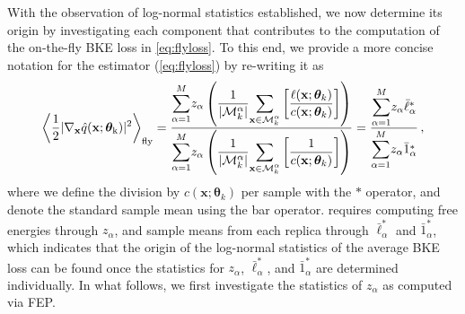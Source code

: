 \documentclass{article}
\numberwithin{equation}{section}
\def\*#1{\mathbf{#1}}
\theoremstyle{definition}
\theoremstyle{remark}
\def\thetab{\boldsymbol{\theta}}
\begin{document}
With the observation of log-normal statistics established, we now determine its origin by investigating each component that contributes to the computation of the on-the-fly BKE loss in \cref{eq:flyloss}. To this end, we provide a more concise notation for the estimator (\cref{eq:flyloss}) by re-writing it as
\begin{align}
    \left\langle \frac{1}{2} |\nabla_{\* x} \hat{q}(\* x; \thetab_{\mathrm{k}}) |^2 \right\rangle_{\mathrm{fly}} = \frac{\mathlarger{\sum}\limits_{\alpha=1}^M  z_{\alpha} \left(\dfrac{1}{|\mathcal{M}^\alpha_k|}\mathlarger{\sum}\limits_{\* x \in \mathcal{M}^\alpha_k}  \left[\dfrac{\ell(\* x; \thetab_{k})}{c(\* x; \thetab_k)} \right] \right) }{ \mathlarger{\sum}\limits_{\alpha=1}^M z_{\alpha}\left(\dfrac{1}{|\mathcal{M}^\alpha_k|}\mathlarger{\sum}\limits_{\* x \in \mathcal{M}^\alpha_k} \left[\dfrac{1}{c(\* x; \thetab_k) } \right] \right) } = \frac{\mathlarger{\sum}\limits_{\alpha=1}^M  z_{\alpha} \bar{\ell}^{*}_{\alpha} }{ \mathlarger{\sum}\limits_{\alpha=1}^M z_{\alpha} \bar{1}^{*}_{\alpha}  } \,, \label{eq:estimator}
\end{align}
where we define the division by $ c(\* x; \thetab_k) $ per sample with the $ * $ operator, and denote the standard sample mean using the bar operator.  requires computing free energies through $z_\alpha$, and sample means from each replica through $\bar{\ell}^*_\alpha$ and $\bar{1}^*_\alpha$, which indicates that the origin of the log-normal statistics of the average BKE loss can be found once the statistics for $ z_\alpha $, $\bar{\ell}^*_\alpha$, and $\bar{1}^*_\alpha$ are determined individually.
In what follows, we first investigate the statistics of $z_\alpha$ as computed via FEP.
\end{document}
